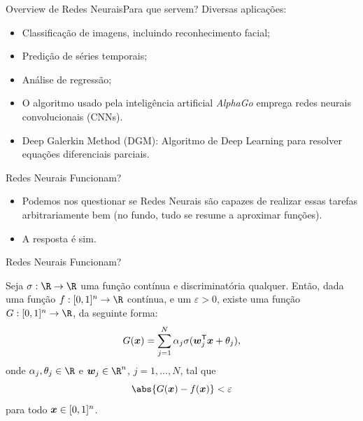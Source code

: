 \documentclass[13pt]{beamer}
\begin{document}
\begin{frame}{Overview de Redes Neurais}{Para que servem?}
    \vspace{2pt}
    Diversas aplicações:
    \begin{itemize}
        \item Classificação de imagens, incluindo reconhecimento facial;
        \item Predição de séries temporais;
        \item Análise de regressão;
        \item O algoritmo usado pela inteligência artificial \emph{AlphaGo} emprega redes neurais convolucionais (CNNs).
        \item Deep Galerkin Method (DGM): Algoritmo de Deep Learning para resolver equações diferenciais parciais.
    \end{itemize}
\end{frame}


\begin{frame}{Redes Neurais Funcionam?}
    \begin{itemize}
        \item<1-> Podemos nos questionar se Redes Neurais são capazes de realizar essas tarefas arbitrariamente bem (no fundo, tudo se resume a aproximar funções).
        \item<2-> A resposta é sim.
    \end{itemize}
\end{frame}

\begin{frame}{Redes Neurais Funcionam?}
    \begin{TAU}
        Seja \( \sigma : \R \to \R \) uma função contínua e discriminatória qualquer.
        Então, dada uma função \( f : [0, 1]^{ n } \to \R \) contínua, e um \( \varepsilon > 0 \), existe uma função \( G : [0, 1]^{ n } \to \R \), da seguinte forma:
        \begin{equation*}
            G ( \bm{x} ) = \sum_{ j=1 }^{ N } \alpha_{ j } \sigma ( \bm{w}_{ j }^{ \mathsf{T} } \bm{x} + \theta_{ j } )
        ,\end{equation*}
        onde \( \alpha_{ j }, \theta_{ j } \in \R \) e \( \bfw_{ j } \in \R^{ n } \), \( j = 1, \dots, N \), tal que
        \begin{equation*}
            \abs{ G ( \bfx ) - f ( \bfx ) } < \varepsilon
        \end{equation*}
        para todo \( \bm{x} \in [0, 1]^{ n } \).
    \end{TAU}
\end{frame}
\end{document}
